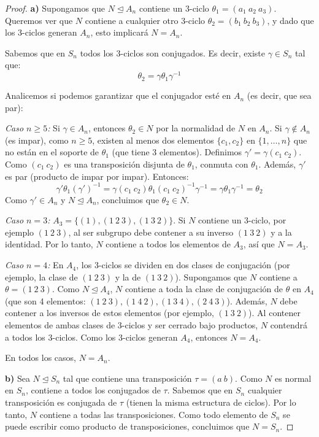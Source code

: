 \begin{proof}
    \textbf{a)} Supongamos que $N \trianglelefteq A_n$ contiene un 3-ciclo $\theta_1 = (a_1 \ a_2 \ a_3)$.
    Queremos ver que $N$ contiene a cualquier otro 3-ciclo $\theta_2 = (b_1 \ b_2 \ b_3)$, y dado que los 3-ciclos generan $A_n$, esto implicará $N=A_n$.
    
    Sabemos que en $S_n$ todos los 3-ciclos son conjugados. Es decir, existe $\gamma \in S_n$ tal que:
    \begin{equation*}
        \theta_2 = \gamma \theta_1 \gamma^{-1}
    \end{equation*}
    
    Analicemos si podemos garantizar que el conjugador esté en $A_n$ (es decir, que sea par):
    
    \textit{Caso $n \ge 5$:}
    Si $\gamma \in A_n$, entonces $\theta_2 \in N$ por la normalidad de $N$ en $A_n$.
    Si $\gamma \notin A_n$ (es impar), como $n \ge 5$, existen al menos dos elementos $\{c_1, c_2\}$ en $\{1, \dots, n\}$ que no están en el soporte de $\theta_1$ (que tiene 3 elementos).
    Definimos $\gamma' = \gamma (c_1 \ c_2)$. Como $(c_1 \ c_2)$ es una transposición disjunta de $\theta_1$, conmuta con $\theta_1$.
    Además, $\gamma'$ es par (producto de impar por impar).
    Entonces:
    \begin{equation*}
        \gamma' \theta_1 (\gamma')^{-1} = \gamma (c_1 \ c_2) \theta_1 (c_1 \ c_2)^{-1} \gamma^{-1} = \gamma \theta_1 \gamma^{-1} = \theta_2
    \end{equation*}
    Como $\gamma' \in A_n$ y $N \trianglelefteq A_n$, concluimos que $\theta_2 \in N$.
    
    \textit{Caso $n = 3$:}
    $A_3 = \{(1), (1 \ 2 \ 3), (1 \ 3 \ 2)\}$.
    Si $N$ contiene un 3-ciclo, por ejemplo $(1 \ 2 \ 3)$, al ser subgrupo debe contener a su inverso $(1 \ 3 \ 2)$ y a la identidad.
    Por lo tanto, $N$ contiene a todos los elementos de $A_3$, así que $N = A_3$.
    
    \textit{Caso $n = 4$:}
    En $A_4$, los 3-ciclos se dividen en dos clases de conjugación (por ejemplo, la clase de $(1 \ 2 \ 3)$ y la de $(1 \ 3 \ 2)$).
    Supongamos que $N$ contiene a $\theta = (1 \ 2 \ 3)$.
    Como $N \trianglelefteq A_4$, $N$ contiene a toda la clase de conjugación de $\theta$ en $A_4$ (que son 4 elementos: $(1 \ 2 \ 3), (1 \ 4 \ 2), (1 \ 3 \ 4), (2 \ 4 \ 3)$).
    Además, $N$ debe contener a los inversos de estos elementos (por ejemplo, $(1 \ 3 \ 2)$).
    Al contener elementos de ambas clases de 3-ciclos y ser cerrado bajo productos, $N$ contendrá a todos los 3-ciclos.
    Como los 3-ciclos generan $A_4$, entonces $N = A_4$.
    
    En todos los casos, $N = A_n$.

    \textbf{b)} Sea $N \trianglelefteq S_n$ tal que contiene una transposición $\tau = (a \ b)$.
    Como $N$ es normal en $S_n$, contiene a todos los conjugados de $\tau$.
    Sabemos que en $S_n$ cualquier transposición es conjugada de $\tau$ (tienen la misma estructura de ciclos).
    Por lo tanto, $N$ contiene a todas las transposiciones.
    Como todo elemento de $S_n$ se puede escribir como producto de transposiciones, concluimos que $N = S_n$.
\end{proof}

